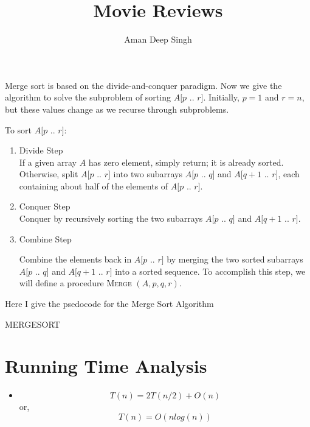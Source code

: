 \documentclass{report}
\title{Movie Reviews}
\author{Aman Deep Singh}
\date{}
\begin{document}
\maketitle

Merge sort\cite{Mergesort} is based on the divide-and-conquer paradigm. Now we give the algorithm to solve the subproblem of sorting $A[p$ .. $r]$. Initially, $p = 1$ and $r = n$, but these values change as we recurse through subproblems.

To sort $A[p$ .. $r]$:
\begin{enumerate}
\item{ Divide Step\\If a given array $A$ has zero element, simply return; it is already sorted. Otherwise, split $A[p$ .. $r]$ into two subarrays $A[p$ .. $q]$ and $A[q + 1$ .. $r]$, each containing about half of the elements of $A[p$ .. $r]$.}
\item{Conquer Step\\
Conquer by recursively sorting the two subarrays $A[p$ .. $q]$ and $A[q + 1$ .. $r]$.}
\item{Combine Step

Combine the elements back in $A[p$ .. $r]$ by merging the two sorted subarrays $A[p$ .. $q]$ and $A[q + 1$ .. $r]$ into a sorted sequence. To accomplish this step, we will define a procedure \textsc{Merge} $(A, p, q, r)$.}
\end{enumerate}

Here I give the psedocode for the Merge Sort Algorithm\\
\begin{algorithm}[H]
\DontPrintSemicolon
{}
  \;
\caption{MERGESORT\label{MS}}

\end{algorithm}
\pagebreak
\section*{Running Time Analysis}
\begin{itemize}
\item{
\[ T(n) = 2T(n/2) + O(n)\]}
or, \[T(n) = O(nlog(n))\]
\end{itemize}

\medskip


\end{document}
